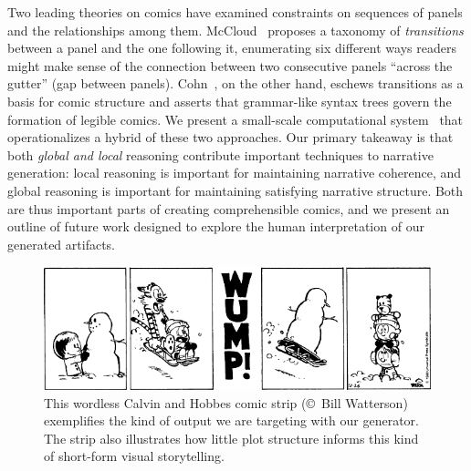 Two leading theories on comics have examined constraints on sequences of panels
and the relationships among them.
McCloud~\cite{mcCloud1993understanding} proposes a taxonomy of {\em
transitions} between a panel and the one following it, enumerating six
different ways readers might make sense of the connection between two
consecutive panels ``across the gutter'' (gap between panels).
Cohn~\cite{cohn2013visual}, on the other hand, eschews transitions as a
basis for comic structure and asserts that grammar-like syntax trees govern
the formation of legible comics.
We present a small-scale computational
system~\cite{montfort2012small} that operationalizes a hybrid of these two
approaches.
Our primary takeaway is that both {\em global and local} reasoning
contribute important techniques to narrative generation: local reasoning is
important for maintaining narrative coherence, and global reasoning is
important for maintaining satisfying narrative structure. Both are thus
important parts of creating comprehensible comics, and we present an
outline of future work designed to explore the human interpretation of our
generated artifacts.

\begin{figure}
\includegraphics[width=\columnwidth]{calvin-and-hobbes.png}
\caption{
This wordless Calvin and Hobbes comic strip ({\small \copyright}~Bill Watterson)
exemplifies the kind of output we are targeting with our generator. The strip also
illustrates how little plot structure informs this kind of short-form visual
storytelling.
}
\label{fig:calvin}
\end{figure}



